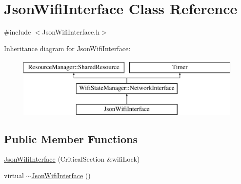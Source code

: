 \hypertarget{classJsonWifiInterface}{}\section{Json\+Wifi\+Interface Class Reference}
\label{classJsonWifiInterface}


{\ttfamily \#include $<$Json\+Wifi\+Interface.\+h$>$}

Inheritance diagram for Json\+Wifi\+Interface\+:\begin{figure}[H]
\begin{center}
\leavevmode
\includegraphics[height=3.000000cm]{classJsonWifiInterface}
\end{center}
\end{figure}
\subsection*{Public Member Functions}
\begin{DoxyCompactItemize}
\item 
\mbox{\hyperlink{classJsonWifiInterface_ad2d11aacad93fea2bac3f1464c1a036a}{Json\+Wifi\+Interface}} (Critical\+Section \&wifi\+Lock)
\item 
virtual \mbox{\hyperlink{classJsonWifiInterface_a6de7a2ea9b9e734ca45169f9d188489b}{$\sim$\+Json\+Wifi\+Interface}} ()
\end{DoxyCompactItemize}
